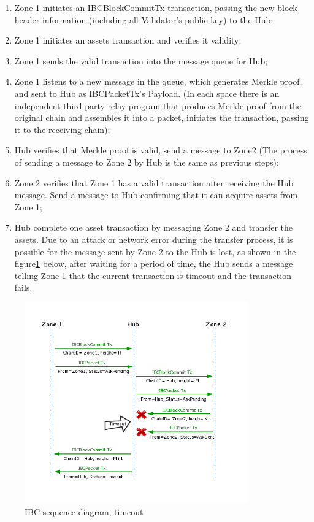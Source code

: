 \begin{enumerate}
    \item Zone 1 initiates an IBCBlockCommitTx transaction, passing the new block header information (including all Validator's public key) to the Hub;
    \item Zone 1 initiates an assets transaction and verifies it validity;
    \item Zone 1 sends the valid transaction into the message queue for Hub;
    \item Zone 1 listens to a new message in the queue, which generates Merkle proof, and sent to Hub as IBCPacketTx's Payload. (In each space there is an independent third-party relay program that produces Merkle proof from the original chain and assembles it into a packet, initiates the transaction, passing it to the receiving chain);
    \item Hub verifies that Merkle proof is valid, send a message to Zone2 (The process of sending a message to Zone 2 by Hub is the same as previous steps);
    \item Zone 2 verifies that Zone 1 has a valid transaction after receiving the Hub message. Send a message to Hub confirming that it can acquire assets from Zone 1;
    \item Hub complete one asset transaction by messaging Zone 2 and transfer the assets.
\noindent Due to an attack or network error during the transfer process, it is possible for the message sent by Zone 2 to the Hub is lost, as shown in the figure\ref{fig:timeout} below, after waiting for a period of time, the Hub sends a message telling Zone 1 that the current transaction is timeout and the transaction fails.
\end{enumerate}
        \begin{figure}[H]
        \includegraphics[width=0.8587\textwidth]{./figures/IBC_timeout.png}
        \centering
        \caption{IBC sequence diagram, timeout}%
        \centering
        \label{fig:timeout}
        \end{figure}
        

